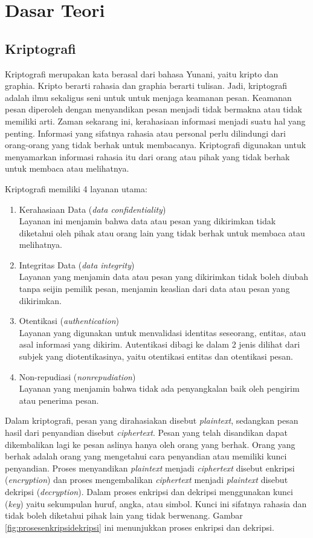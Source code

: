 \chapter{Dasar Teori}
\label{chap:dasar teori}

\section{Kriptografi}
Kriptografi merupakan kata berasal dari bahasa Yunani, yaitu kripto dan graphia. Kripto berarti rahasia dan graphia berarti tulisan. Jadi, kriptografi adalah ilmu sekaligus seni untuk untuk menjaga keamanan pesan. Keamanan pesan diperoleh dengan menyandikan pesan menjadi tidak bermakna atau tidak memiliki arti. Zaman sekarang ini, kerahasiaan informasi menjadi suatu hal yang penting. Informasi yang sifatnya rahasia atau personal perlu dilindungi dari orang-orang yang tidak berhak untuk membacanya. Kriptografi digunakan untuk menyamarkan informasi rahasia itu dari orang atau pihak yang tidak berhak untuk membaca atau melihatnya.

Kriptografi memiliki 4 layanan utama:
\begin{enumerate}
	\item Kerahasiaan Data (\textit{data confidentiality})\\
	Layanan ini menjamin bahwa data atau pesan yang dikirimkan tidak diketahui oleh pihak atau orang lain yang tidak berhak untuk membaca atau melihatnya.
	\item Integritas Data (\textit{data integrity})\\
	Layanan yang menjamin data atau pesan yang dikirimkan tidak boleh diubah tanpa seijin pemilik pesan, menjamin keaslian dari data atau pesan yang dikirimkan.
	\item Otentikasi (\textit{authentication})\\
	Layanan yang digunakan untuk menvalidasi identitas seseorang, entitas, atau  asal informasi yang dikirim. Autentikasi dibagi ke dalam 2 jenis dilihat dari subjek yang diotentikasinya, yaitu otentikasi entitas dan otentikasi pesan.
	\item Non-repudiasi (\textit{nonrepudiation})\\
	Layanan yang menjamin bahwa tidak ada penyangkalan baik oleh pengirim atau penerima pesan.
\end{enumerate}

Dalam kriptografi, pesan yang dirahasiakan disebut \textit{plaintext}, sedangkan pesan hasil dari penyandian disebut \textit{ciphertext}. Pesan yang telah disandikan dapat dikembalikan lagi ke pesan aslinya hanya oleh orang yang berhak. Orang yang berhak adalah orang yang mengetahui cara penyandian atau memiliki kunci penyandian. Proses menyandikan \textit{plaintext} menjadi \textit{ciphertext} disebut enkripsi (\textit{encryption}) dan proses mengembalikan \textit{ciphertext} menjadi \textit{plaintext} disebut dekripsi (\textit{decryption}). Dalam proses enkripsi dan dekripsi menggunakan kunci (\textit{key}) yaitu sekumpulan huruf, angka, atau simbol. Kunci ini sifatnya rahasia dan tidak boleh diketahui pihak lain yang tidak berwenang. Gambar \ref{fig:prosesenkripsidekripsi} ini menunjukkan proses enkripsi dan dekripsi.

